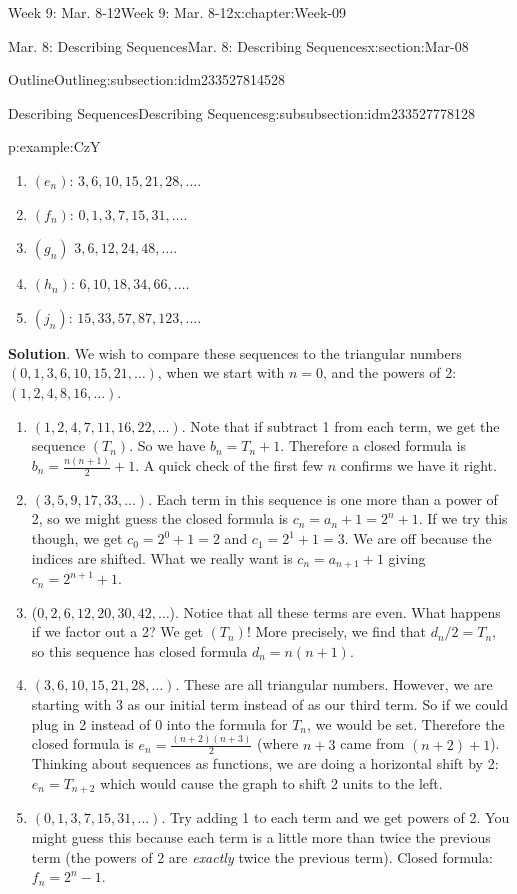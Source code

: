\documentclass[oneside,10pt,]{book}
\newcommand{\blocktitlefont}{\relax}
\numberwithin{equation}{section}
\begin{document}
\begin{chapterptx}{Week 9: Mar. 8-12}{}{Week 9: Mar. 8-12}{}{}{x:chapter:Week-09}
\begin{sectionptx}{Mar. 8: Describing Sequences}{}{Mar. 8: Describing Sequences}{}{}{x:section:Mar-08}
\begin{subsectionptx}{Outline}{}{Outline}{}{}{g:subsection:idm233527814528}
\begin{subsubsectionptx}{Describing Sequences}{}{Describing Sequences}{}{}{g:subsubsection:idm233527778128}
\begin{example}{}{p:example:CzY}
\begin{enumerate}
\item{}\((e_n)\): \(3, 6, 10, 15, 21, 28, \ldots\).%
\item{}\((f_n)\): \(0, 1, 3, 7, 15, 31, \ldots \).%
\item{}\((g_n)\) \(3, 6, 12, 24, 48, \ldots \).%
\item{}\((h_n)\): \(6, 10, 18, 34, 66, \ldots \).%
\item{}\((j_n)\): \(15, 33, 57, 87, 123, \ldots\).%
\end{enumerate}
%
\par\smallskip%
\noindent\textbf{\blocktitlefont Solution}.\hypertarget{p:solution:bcI}{}\quad{} We wish to compare these sequences to the triangular numbers \((0, 1, 3, 6, 10, 15, 21,\ldots)\), when we start with \(n=0\), and the powers of 2: \((1, 2, 4, 8, 16, \ldots)\).%
\begin{enumerate}
\item{}\((1, 2, 4, 7, 11, 16, 22, \ldots)\). Note that if subtract 1 from each term, we get the sequence \((T_n)\). So we have \(b_n = T_n + 1\). Therefore a closed formula is \(b_n = \frac{n(n+1)}{2} + 1\). A quick check of the first few \(n\) confirms we have it right.%
\item{}\((3, 5, 9, 17, 33, \ldots )\). Each term in this sequence is one more than a power of 2, so we might guess the closed formula is \(c_n = a_n+1 = 2^n + 1\). If we try this though, we get \(c_0 = 2^0 + 1 = 2\) and \(c_1 = 2^1 + 1 = 3\). We are off because the indices are shifted. What we really want is \(c_n = a_{n+1}+1\) giving \(c_n = 2^{n+1} + 1\).%
\item{}(\(0, 2, 6, 12, 20, 30, 42,\ldots \)). Notice that all these terms are even. What happens if we factor out a 2? We get \((T_n)\)! More precisely, we find that \(d_n/2 = T_n\), so this sequence has closed formula \(d_n = n(n+1)\).%
\item{}\((3, 6, 10, 15, 21, 28, \ldots)\). These are all triangular numbers. However, we are starting with 3 as our initial term instead of as our third term. So if we could plug in 2 instead of 0 into the formula for \(T_n\), we would be set. Therefore the closed formula is \(e_n = \frac{(n+2)(n+3)}{2}\) (where \(n+3\) came from \((n+2)+1\)). Thinking about sequences as functions, we are doing a horizontal shift by 2: \(e_n = T_{n+2}\) which would cause the graph to shift 2 units to the left.%
\item{}\((0, 1, 3, 7, 15, 31, \ldots )\). Try adding 1 to each term and we get powers of 2. You might guess this because each term is a little more than twice the previous term (the powers of 2 are \emph{exactly} twice the previous term). Closed formula: \(f_n = 2^{n} - 1\).%

\end{enumerate}
\end{example}
\end{subsubsectionptx}
\end{subsectionptx}
\end{sectionptx}
\end{chapterptx}
\end{document}
